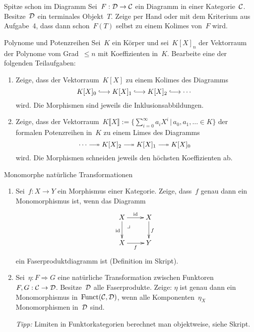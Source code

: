 \documentclass{pizzablatt}
\begin{document}

\setlength{\aufgabenskip}{1.5em}

\begin{aufgabe}{Spitze schon im Diagramm}
Sei~$F:\mathcal{D} \to \mathcal{C}$ ein Diagramm in einer Kategorie~$\mathcal{C}$. Besitze~$\mathcal{D}$ ein
terminales Objekt~$T$.
Zeige per Hand oder mit dem Kriterium aus Aufgabe~4, dass dann
schon~$F(T)$ selbst zu einem Kolimes von~$F$ wird.
\end{aufgabe}

\begin{aufgabe}{Polynome und Potenzreihen}
Sei~$K$ ein Körper und sei~$K[X]_n$ der Vektorraum der Polynome
vom Grad~$\leq n$ mit Koeffizienten in~$K$. Bearbeite eine der folgenden Teilaufgaben:
\begin{enumerate}
\item Zeige, dass der Vektorraum~$K[X]$ zu einem Kolimes des Diagramms
\[ K[X]_0 \lhra K[X]_1 \lhra K[X]_2 \lhra \cdots \]
wird. Die Morphismen sind jeweils die Inklusionsabbildungen.
\item Zeige, dass der Vektorraum~$K\llbracket X \rrbracket := \{
\sum_{i=0}^\infty a_i X^i \,|\,
a_0, a_1, \ldots \in K \}$ der formalen
Potenzreihen in~$K$ zu einem Limes des Diagramms
\[ \cdots \lthra K[X]_2 \lthra K[X]_1 \lthra K[X]_0 \]
wird. Die Morphismen schneiden jeweils den höchsten Koeffizienten ab.
\end{enumerate}
\end{aufgabe}

\begin{aufgabe}{Monomorphe natürliche Transformationen}
\begin{enumerate}
\item Sei~$f:X \to Y$ ein Morphismus einer Kategorie. Zeige, dass~$f$ genau
dann ein Monomorphismus ist, wenn das Diagramm
\[ \xymatrix{
  \ar @{} [dr] |{\begin{array}{l}\lrcorner\ \ \ \ \ \ \\\\\end{array}}
  X \ar[r]^\id \ar[d]_\id & X \ar[d]^f \\
  X \ar[r]_f & Y
} \]
ein Faserproduktdiagramm ist (Definition im Skript).
\item Sei~$\eta : F \Rightarrow G$ eine natürliche Transformation zwischen
Funktoren $F, G : \mathcal{C} \to \mathcal{D}$. Besitze~$\mathcal{D}$ alle Faserprodukte. Zeige: $\eta$
ist genau dann ein Monomorphismus in~$\mathrm{Funct}(\mathcal{C},\mathcal{D})$, wenn alle
Komponenten~$\eta_X$ Monomorphismen in~$\mathcal{D}$ sind.

\emph{Tipp:} Limiten in Funktorkategorien berechnet man objektweise, siehe
Skript.
\end{enumerate}
\end{aufgabe}
\end{document}

